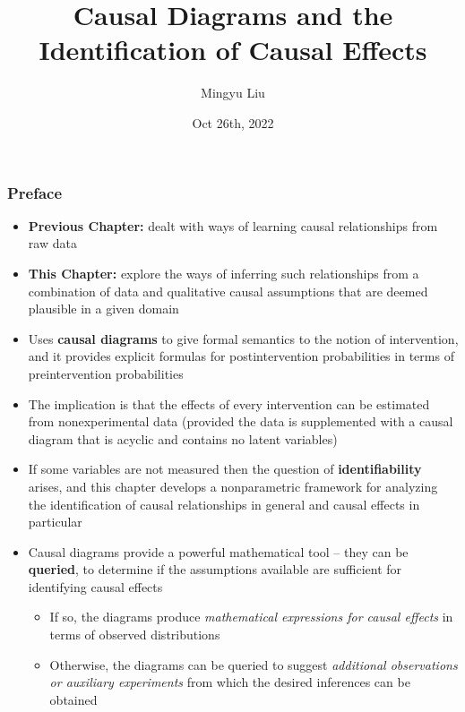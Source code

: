 \documentclass{beamer}
\title{Causal Diagrams and the Identification of Causal Effects}
\author{Mingyu Liu}
\date{Oct 26th, 2022}
\begin{document}
\frame{\titlepage}

\begin{frame}
\frametitle{Preface}
\begin{itemize}
\item \textbf{Previous Chapter:} dealt with ways of learning causal relationships from raw data
\item \textbf{This Chapter:} explore the ways of inferring such relationships from a combination of data and qualitative causal assumptions that are deemed plausible in a given domain
\item Uses \textbf{causal diagrams} to give formal semantics to the notion of intervention, and it provides explicit formulas for postintervention probabilities in terms of preintervention probabilities
\item The implication is that the effects of every intervention can be estimated from nonexperimental data (provided the data is supplemented with a causal diagram that is acyclic and contains no latent variables)
\end{itemize}
\end{frame}

\begin{frame}
\begin{itemize}
\item If some variables are not measured then the question of \textbf{identifiability} arises, and this chapter develops a nonparametric framework for analyzing the identification of causal relationships in general and causal effects in particular
\item Causal diagrams provide a powerful mathematical tool -- they can be \textbf{queried}, to determine if the assumptions available are sufficient for identifying causal effects
\begin{itemize}
  \item If so, the diagrams produce \textit{mathematical expressions for causal effects} in terms of observed distributions
  \item Otherwise, the diagrams can be queried to suggest \textit{additional observations or auxiliary experiments} from which the desired inferences can be obtained
\end{itemize}
\end{itemize}
\end{frame}
\end{document}
